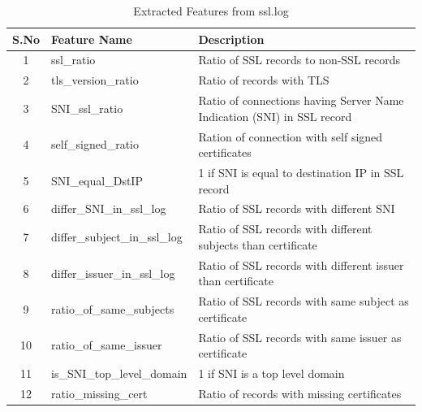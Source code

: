 \begin{table}[!htb]
	\caption{Extracted Features from ssl.log\label{tab:3}}
	\begin{center}
		\begin{tabular}{c|p{}|p{}}\hline\hline
			S.No & Feature Name & \multicolumn{1}{l}{Description} \\ \hline
			1 & ssl\_ratio & Ratio of SSL records to non-SSL records\\
			2 & tls\_version\_ratio & Ratio of records with TLS \\
			3 & SNI\_ssl\_ratio & Ratio of connections having Server Name Indication (SNI) in SSL record\\
			4 & self\_signed\_ratio & Ration of connection with self signed certificates\\
			5 & SNI\_equal\_DstIP & 1 if SNI is equal to destination IP in SSL record\\
			6 & differ\_SNI\_in\_ssl\_log & Ratio of SSL records with different SNI\\
			7 & differ\_subject\_in\_ssl\_log & Ratio of SSL records with different subjects than certificate\\
			8 & differ\_issuer\_in\_ssl\_log & Ratio of SSL records with different issuer than certificate\\
			9 & ratio\_of\_same\_subjects & Ratio of SSL records with same subject as certificate\\
			10 & ratio\_of\_same\_issuer & Ratio of SSL records with same issuer as certificate\\
			11 & is\_SNI\_top\_level\_domain & 1 if SNI is a top level domain\\
			12 & ratio\_missing\_cert & Ratio of records with missing certificates\\
			\hline\hline
		\end{tabular}
	\end{center}
\end{table}

